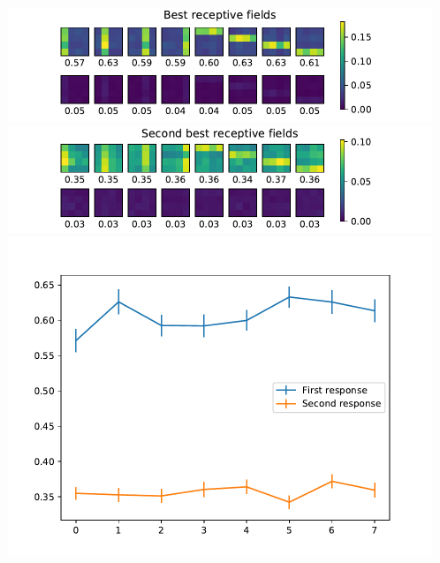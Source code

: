 \documentclass[10pt,a4paper]{article}
\begin{document}
		\begin{figure}
			\centering
			
			\includegraphics[width=1\linewidth]{./double_best_fields1}
			\includegraphics[width=1\linewidth]{./double_best_fields2}
			\includegraphics[width=1\linewidth]{./double_best_responses}
			\label{fig:comp_decay_ysens}
			\caption{}
		\end{figure}
		
		\newpage
		\printbibliography
\end{document}
